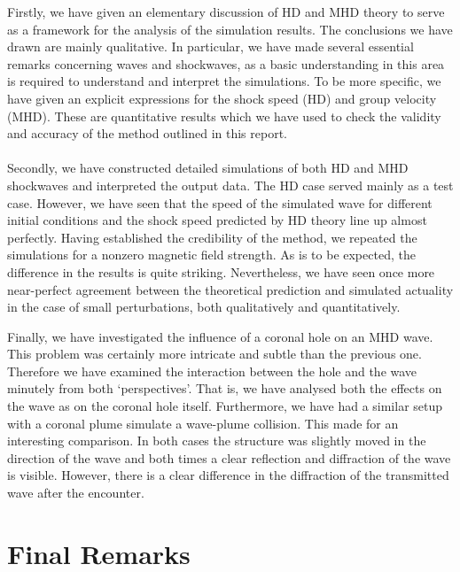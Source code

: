 Firstly, we have given an elementary discussion of HD and MHD theory to serve as a framework for the analysis of the simulation results. The conclusions we have drawn are mainly qualitative. In particular, we have made several essential remarks concerning waves and shockwaves, as a basic understanding in this area is required to understand and interpret the simulations. To be more specific, we have given an explicit expressions for the shock speed (HD) and group velocity (MHD). These are quantitative results which we have used to check the validity and accuracy of the method outlined in this report. \\
\\
Secondly, we have constructed detailed simulations of both HD and MHD shockwaves and interpreted the output data. 
The HD case served mainly as a test case. 
However, we have seen that the speed of the simulated wave for different initial conditions and the shock speed predicted by HD theory line up almost perfectly. 
Having established the credibility of the method, we repeated the simulations for a nonzero magnetic field strength. 
As is to be expected, the difference in the results is quite striking. 
Nevertheless, we have seen once more near-perfect agreement between the theoretical prediction and simulated actuality in the case of small perturbations, both qualitatively and quantitatively.

Finally, we have investigated the influence of a coronal hole on an MHD wave. 
This problem was certainly more intricate and subtle than the previous one. 
Therefore we have examined the interaction between the hole and the wave minutely from both `perspectives'. 
That is, we have analysed both the effects on the wave as on the coronal hole itself. 
Furthermore, we have had a similar setup with a coronal plume simulate a wave-plume collision. 
This made for an interesting comparison. 
In both cases the structure was slightly moved in the direction of the wave and both times a clear reflection and diffraction of the wave is visible. 
However, there is a clear difference in the diffraction of the transmitted wave after the encounter. 


\section{Final Remarks}

